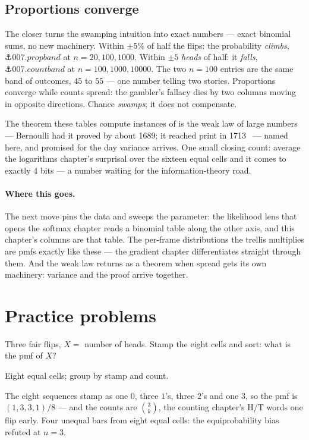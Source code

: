 \begin{narrative}
\section{Proportions converge}

The closer turns the swamping intuition into exact numbers — exact
binomial sums, no new machinery. Within $\pm 5\%$ of half the flips:
the probability \emph{climbs}, $\anchor{007.propband}$ at
$n = 20, 100, 1000$. Within $\pm 5$ \emph{heads} of half: it
\emph{falls}, $\anchor{007.countband}$ at $n = 100, 1000, 10000$. The
two $n = 100$ entries are the same band of outcomes, $45$ to $55$ —
one number telling two stories. Proportions converge while counts
spread: the gambler's fallacy dies by two columns moving in opposite
directions. Chance \emph{swamps}; it does not compensate.

The theorem these tables compute instances of is the weak law of
large numbers — Bernoulli had it proved by about 1689; it reached
print in 1713~\cite{probability-grinstead-snell-ch-8-source,
probability-j-j-o-connor-and-e-f-robertson-jacob-bernoulli-mactutor}
— named here, and promised for the day variance arrives. One small
closing count: average the logarithms chapter's surprisal over the
sixteen equal cells and it comes to exactly $4$ bits — a number
waiting for the information-theory road.

\paragraph{Where this goes.} The next move pins the data and sweeps
the parameter: the likelihood lens that opens the softmax chapter
reads a binomial table along the other axis, and this chapter's
columns are that table. The per-frame distributions the trellis
multiplies are pmfs exactly like these — the gradient chapter
differentiates straight through them. And the weak law returns as a
theorem when spread gets its own machinery: variance and the proof
arrive together.
\end{narrative}

\section*{Practice problems}

\begin{problem}
Three fair flips, $X =$ number of heads. Stamp the eight cells and
sort: what is the pmf of $X$?
\begin{hint}
Eight equal cells; group by stamp and count.
\end{hint}
\begin{solution}
The eight sequences stamp as one $0$, three $1$'s, three $2$'s and
one $3$, so the pmf is $(1, 3, 3, 1)/8$ — and the counts are
$\binom{3}{k}$, the counting chapter's H/T words one flip early.
Four unequal bars from eight equal cells: the equiprobability bias
refuted at $n = 3$.
\end{solution}
\end{problem}

